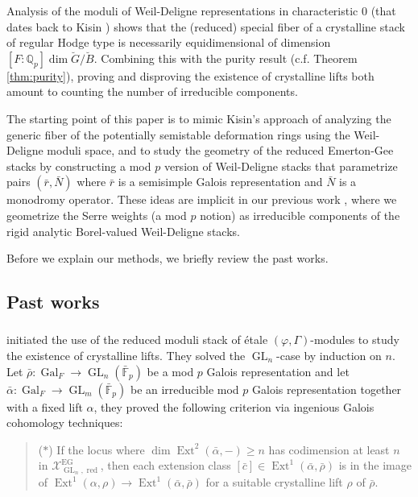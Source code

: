 \documentclass[11pt]{amsart}
\newcommand{\MINOREDITED}[1]{#1}
\theoremstyle{definition}
\newcommand{\Q}{\mathbb{Q}}
\newcommand{\Ext}{{\operatorname{Ext}}}
\newcommand{\bFp}{\bar{\mathbb{F}}_p}
\newcommand{\cX}{\mathcal{X}}
\newcommand{\bG}{\breve{G}}
\newcommand{\bB}{\breve{B}}
\DeclareMathOperator{\EG}{EG}
\DeclareMathOperator{\GL}{GL}
\DeclareMathOperator{\red}{red}
\DeclareMathOperator{\Gal}{Gal}
\begin{document}
Analysis of the moduli of Weil-Deligne representations
in characteristic $0$
(that dates back to Kisin \cite{Kis08})
shows that
the (reduced) special fiber of a crystalline stack
of regular Hodge type
is necessarily equidimensional of dimension
$[F:\Q_p]\dim \bG/\bB$.
Combining this with
the purity result (c.f. Theorem \ref{thm:purity}),
proving and disproving the existence
of crystalline lifts
both
amount to counting the number
of irreducible components.

The starting point of this paper
is to mimic Kisin's approach
of analyzing the generic fiber
of the potentially semistable deformation rings
using the Weil-Deligne moduli space,
and to study the geometry of the
reduced Emerton-Gee stacks
by constructing a mod $p$
version of Weil-Deligne stacks
that parametrize
pairs $(\bar r, \bar N)$
where $\bar r$ is a semisimple Galois representation
and $\bar N$ is a monodromy operator.
These ideas are implicit in our previous work
\cite{Lin25},
where we geometrize the Serre weights
(a mod $p$ notion)
as irreducible components of the rigid analytic
Borel-valued Weil-Deligne stacks.

Before we explain our methods,
we briefly review the past works.

\subsection{Past works}

\subsubsection{}

\MINOREDITED{\cite{EG23} initiated the use}
of the reduced moduli stack
of \'etale $(\varphi, \Gamma)$-modules
to study the existence of crystalline lifts.
They solved the
$\GL_n$-case by induction on $n$.
Let $\bar\rho:\Gal_F\to \GL_n(\bFp)$
be a mod $p$ Galois representation
and let $\bar\alpha:\Gal_F\to \GL_m(\bFp)$
be an irreducible mod $p$ Galois representation
together with a fixed lift $\alpha$,
they proved the following criterion
via ingenious Galois cohomology techniques:

\begin{quotation}
($*$)
If the locus where
$\dim \Ext^2(\bar\alpha,-)\ge n$
has codimension at least $n$ in
$\cX^{\EG}_{\GL_n,\red}$,
then each extension class
$[\bar c]\in \Ext^1(\bar\alpha,\bar\rho)$
is in the image of 
$\Ext^1(\alpha,\rho)\to \Ext^1(\bar\alpha,\bar\rho)$
for a suitable crystalline lift $\rho$ of $\bar\rho$.
\end{quotation}
\end{document}
